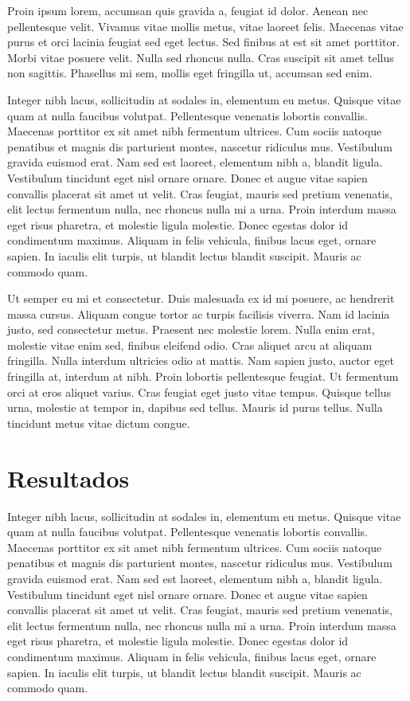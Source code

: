 \begin{btUnit}
Proin ipsum lorem, accumsan quis gravida a, feugiat id dolor. Aenean
nec pellentesque velit. Vivamus vitae mollis metus, vitae laoreet
felis. Maecenas vitae purus et orci lacinia feugiat sed eget lectus.
Sed finibus at est sit amet porttitor. Morbi vitae posuere velit.
Nulla sed rhoncus nulla. Cras suscipit sit amet tellus non sagittis.
Phasellus mi sem, mollis eget fringilla ut, accumsan sed enim.

Integer nibh lacus, sollicitudin at sodales in, elementum eu metus.
Quisque vitae quam at nulla faucibus volutpat. Pellentesque venenatis
lobortis convallis. Maecenas porttitor ex sit amet nibh fermentum
ultrices. Cum sociis natoque penatibus et magnis dis parturient
montes, nascetur ridiculus mus. Vestibulum gravida euismod erat. Nam
sed est laoreet, elementum nibh a, blandit ligula. Vestibulum
tincidunt eget nisl ornare ornare. Donec et augue vitae sapien
convallis placerat sit amet ut velit. Cras feugiat, mauris sed pretium
venenatis, elit lectus fermentum nulla, nec rhoncus nulla mi a urna.
Proin interdum massa eget risus pharetra, et molestie ligula molestie.
Donec egestas dolor id condimentum maximus. Aliquam in felis vehicula,
finibus lacus eget, ornare sapien. In iaculis elit turpis, ut blandit
lectus blandit suscipit. Mauris ac commodo quam.

Ut semper eu mi et consectetur. Duis malesuada ex id mi posuere, ac
hendrerit massa cursus. Aliquam congue tortor ac turpis facilisis
viverra. Nam id lacinia justo, sed consectetur metus. Praesent nec
molestie lorem. Nulla enim erat, molestie vitae enim sed, finibus
eleifend odio. Cras aliquet arcu at aliquam fringilla. Nulla interdum
ultricies odio at mattis. Nam sapien justo, auctor eget fringilla at,
interdum at nibh. Proin lobortis pellentesque feugiat. Ut fermentum
orci at eros aliquet varius. Cras feugiat eget justo vitae tempus.
Quisque tellus urna, molestie at tempor in, dapibus sed tellus. Mauris
id purus tellus. Nulla tincidunt metus vitae dictum congue.

\section{Resultados}

Integer nibh lacus, sollicitudin at sodales in, elementum eu metus.
Quisque vitae quam at nulla faucibus volutpat. Pellentesque venenatis
lobortis convallis. Maecenas porttitor ex sit amet nibh fermentum
ultrices. Cum sociis natoque penatibus et magnis dis parturient
montes, nascetur ridiculus mus. Vestibulum gravida euismod erat. Nam
sed est laoreet, elementum nibh a, blandit ligula. Vestibulum
tincidunt eget nisl ornare ornare. Donec et augue vitae sapien
convallis placerat sit amet ut velit. Cras feugiat, mauris sed pretium
venenatis, elit lectus fermentum nulla, nec rhoncus nulla mi a urna.
Proin interdum massa eget risus pharetra, et molestie ligula molestie.
Donec egestas dolor id condimentum maximus. Aliquam in felis vehicula,
finibus lacus eget, ornare sapien. In iaculis elit turpis, ut blandit
lectus blandit suscipit. Mauris ac commodo quam.


\end{btUnit}
